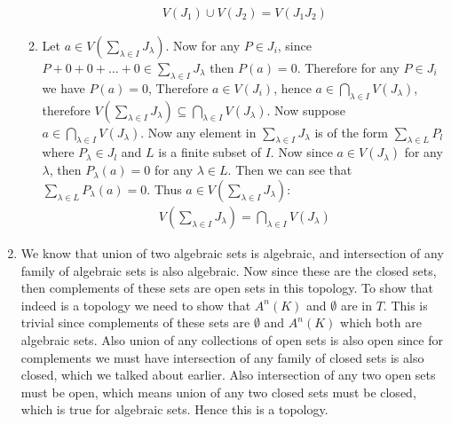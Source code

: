 \begin{enumerate}[label=\ilabel]
\begin{enumerate}
                \begin{gather*}
                    V(J_1) \cup V(J_2) = V(J_1J_2)
                \end{gather*}
            \item
                Let $a \in V(\sum_{\lambda \in I} J_\lambda)$. Now for any $P \in J_i$, since $P + 0 + 0 + \dots + 0 \in \sum_{\lambda \in I} J_\lambda$ then $P(a) = 0$. Therefore for any $P \in J_i$ we have $P(a) = 0$, Therefore $a \in V(J_i)$, hence $a \in \bigcap_{\lambda \in I} V(J_\lambda)$, therefore $V(\sum_{\lambda \in I} J_\lambda ) \subseteq \bigcap_{\lambda \in I} V(J_\lambda)$.
                Now suppose $a \in \bigcap_{\lambda \in I} V(J_\lambda)$. Now any element in $\sum_{\lambda \in I} J_\lambda$ is of the form $\sum_{\lambda \in L} P_l$ where $P_\lambda \in J_l$ and $L$ is a finite subset of $I$. Now since $a \in V(J_\lambda)$ for any $\lambda$, then $P_\lambda(a) = 0$ for any $\lambda \in L$. Then we can see that $\sum_{\lambda \in L} P_\lambda(a) = 0$. Thus $a \in V(\sum_{\lambda \in I} J_\lambda)$:
                \begin{gather*}
                    V(\sum_{\lambda \in I} J_\lambda) = \bigcap_{\lambda \in I} V(J_\lambda)
                \end{gather*}
        \end{enumerate}
    \item 
        We know that union of two algebraic sets is algebraic, and intersection of any family of algebraic sets is also algebraic. Now since these are the closed sets, then complements of these sets are open sets in this topology.
        To show that indeed is a topology we need to show that $A^n(K)$ and $\emptyset$ are in $T$. This is trivial since complements of these sets are $\emptyset$ and $A^n(K)$ which both are algebraic sets. Also union of any collections of open sets is also open since for complements we must have intersection of any family of closed sets is also closed, which we talked about earlier. Also intersection of any two open sets must be open, which means union of any two closed sets must be closed, which is true for algebraic sets. Hence this is a topology.
\end{enumerate}